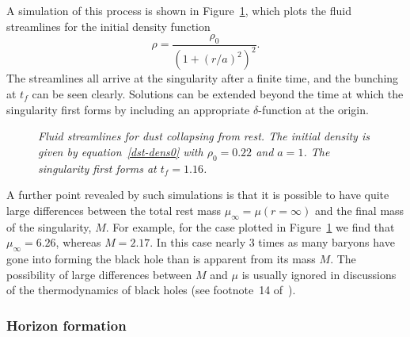 \documentclass[a4paper]{article}
\numberwithin{equation}{section}
\newcommand{\eqv}{=}
\begin{document}
A simulation of this process is shown in Figure~\ref{dst-fig1}, which
plots the fluid streamlines for the initial density function
%
\begin{equation}
\rho = \frac{\rho_0}{(1+(r/a)^2)^2}.
\label{dst-dens0}
\end{equation}
%
The streamlines all arrive at the singularity after a finite time,
and the bunching at $t_f$ can be seen clearly.  Solutions can be
extended beyond the time at which the singularity first forms by
including an appropriate $\delta$-function at the origin.


%
\begin{figure}[t!]
\begin{center}
\end{center}
\caption[dummy1]{\sl Fluid streamlines for dust collapsing from rest.
The initial density is given by equation~\eqref{dst-dens0} with
$\rho_0=0.22$ and $a=1$.  The singularity first forms at $t_f=1.16$.} 
\label{dst-fig1}
\end{figure}
%


A further point revealed by such simulations is that it is possible to
have quite large differences between the total rest mass
$\mu_{\infty}\eqv\mu(r=\infty)$ and the final mass of the
singularity, $M$.  For example, for the case plotted in
Figure~\ref{dst-fig1} we find that $\mu_{\infty}=6.26$, whereas
$M=2.17$.  In this case nearly 3 times as many baryons have gone into
forming the black hole than is apparent from its mass $M$.  The
possibility of large differences between $M$ and $\mu$ is usually
ignored in discussions of the thermodynamics of black holes (see
footnote~14 of~\cite{bek74}).



\subsubsection*{Horizon formation}
\end{document}
